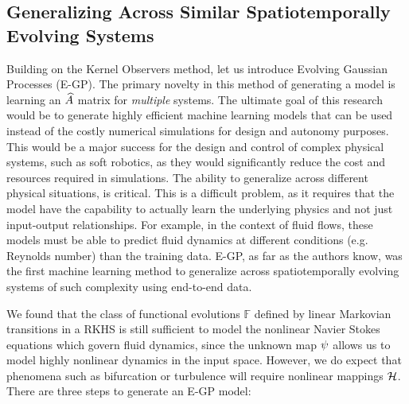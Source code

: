 \subsection{Generalizing Across Similar Spatiotemporally Evolving Systems} \label{sec:egp}
Building on the Kernel Observers method, let us introduce Evolving Gaussian Processes (E-GP). The primary novelty in this method of generating a model is learning an $\widehat{A}$ matrix for \emph{multiple} systems. The ultimate goal of this research would be to generate highly efficient machine learning models that can be used instead of the costly numerical simulations for design and autonomy purposes. This would be a major success for the design and control of complex physical systems, such as soft robotics, as they would significantly reduce the cost and resources required in simulations. The ability to generalize across different physical situations, is critical. This is a difficult problem, as it requires that the model have the capability to actually learn the underlying physics and not just input-output relationships. For example, in the context of fluid flows, these models must be able to predict fluid dynamics at different conditions (e.g. Reynolds number) than the training data. E-GP, as far as the authors know, was the first machine learning method to generalize across spatiotemporally evolving systems of such complexity using end-to-end data.

We found that the class of functional evolutions $\mathbb{F}$ defined by linear Markovian transitions in a RKHS is still sufficient to model the nonlinear Navier Stokes equations which govern fluid dynamics, since the unknown map $\psi$ allows us to model highly nonlinear dynamics in the input space. However, we do expect that phenomena such as bifurcation or turbulence will require nonlinear mappings $\mathcal{H}$. There are three steps to generate an E-GP model:

